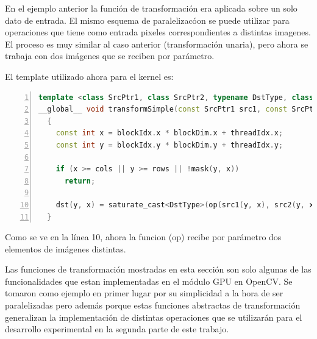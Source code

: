 \documentclass[a4paper,10pt]{report}
\begin{document}
En el ejemplo anterior la función de transformación era aplicada sobre un solo dato de entrada. 
El mismo esquema de paralelizacóon se puede utilizar para operaciones que tiene como entrada pixeles correspondientes a distintas imagenes. 
El proceso es muy similar al caso anterior (transformación unaria), pero ahora se trabaja con dos imágenes que se reciben por parámetro. 

El template utilizado ahora para el kernel es:
 
\begin{lstlisting}[frame=bt,title={aa},caption={modules/cudev/include/opencv2/cudev/grid/detail/transform.hpp},
columns=fullflexible,numbers=left,backgroundcolor=\color{LemonChiffon1},basicstyle=\footnotesize,keywordstyle=\ttfamily\footnotesize,language=C++,stringstyle=\ttfamily,breaklines=true,xleftmargin=0.5em,xrightmargin=0pt,aboveskip=\bigskipamount,belowskip=\bigskipamount]
template <class SrcPtr1, class SrcPtr2, typename DstType, class BinOp, class MaskPtr>
__global__ void transformSimple(const SrcPtr1 src1, const SrcPtr2 src2, GlobPtr<DstType> dst, const BinOp op, const MaskPtr mask, const int rows, const int cols)
  {
    const int x = blockIdx.x * blockDim.x + threadIdx.x;
    const int y = blockIdx.y * blockDim.y + threadIdx.y;

    if (x >= cols || y >= rows || !mask(y, x))
      return;

    dst(y, x) = saturate_cast<DstType>(op(src1(y, x), src2(y, x)));
  }
\end{lstlisting}



Como se ve en la línea 10, ahora la funcion (op) recibe por parámetro dos elementos de imágenes distintas.





Las funciones de transformación mostradas en esta sección son solo algunas de las funcionalidades que estan implementadas en el módulo GPU en OpenCV. 
Se tomaron como ejemplo en primer lugar por su simplicidad a la hora de ser paralelizadas pero además porque estas funciones abstractas de transformación generalizan la implementación
de distintas operaciones que se utilizarán para el desarrollo experimental en la segunda parte de este trabajo.
\end{document}
